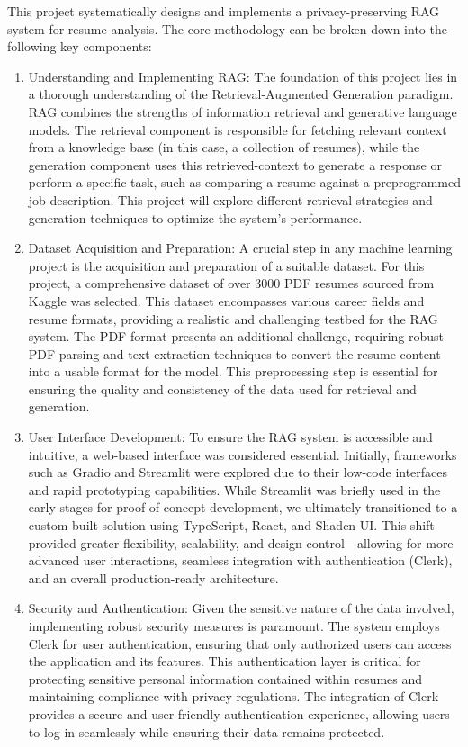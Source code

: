 \documentclass[12pt]{report}
\begin{document}
This project systematically designs and implements a privacy-preserving RAG system for resume analysis. The core methodology can be broken down into the following key components:
\begin{enumerate}

    \item Understanding and Implementing RAG: The foundation of this project lies in a thorough understanding of the Retrieval-Augmented Generation paradigm. RAG combines the strengths of information retrieval and generative language models. The retrieval component is responsible for fetching relevant context from a knowledge base (in this case, a collection of resumes), while the generation component uses this retrieved-context to generate a response or perform a specific task, such as comparing a resume against a preprogrammed job description. This project will explore different retrieval strategies and generation techniques to optimize the system's performance.
    \item Dataset Acquisition and Preparation: A crucial step in any machine learning project is the acquisition and preparation of a suitable dataset. For this project, a comprehensive dataset of over 3000 PDF resumes sourced from Kaggle was selected. This dataset encompasses various career fields and resume formats, providing a realistic and challenging testbed for the RAG system. The PDF format presents an additional challenge, requiring robust PDF parsing and text extraction techniques to convert the resume content into a usable format for the model. This preprocessing step is essential for ensuring the quality and consistency of the data used for retrieval and generation.
    \item User Interface Development: To ensure the RAG system is accessible and intuitive, a web-based interface was considered essential. Initially, frameworks such as Gradio and Streamlit were explored due to their low-code interfaces and rapid prototyping capabilities. While Streamlit was briefly used in the early stages for proof-of-concept development, we ultimately transitioned to a custom-built solution using TypeScript, React, and Shadcn UI. This shift provided greater flexibility, scalability, and design control—allowing for more advanced user interactions, seamless integration with authentication (Clerk), and an overall production-ready architecture.
    \item Security and Authentication: Given the sensitive nature of the data involved, implementing robust security measures is paramount. The system employs Clerk for user authentication, ensuring that only authorized users can access the application and its features. This authentication layer is critical for protecting sensitive personal information contained within resumes and maintaining compliance with privacy regulations. The integration of Clerk provides a secure and user-friendly authentication experience, allowing users to log in seamlessly while ensuring their data remains protected.

\end{enumerate}
\end{document}
